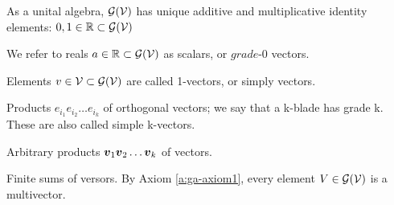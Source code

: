 \begin{definition}
    As a unital algebra, $\mathcal{G}(\mathcal{V})$ has unique additive and multiplicative identity elements: $0, 1 \in \mathbb{R} \subset \mathcal{G}(\mathcal{V})$
\end{definition}
\begin{definition}[Scalars]
    We refer to reals $a \in \mathbb{R} \subset \mathcal{G}(\mathcal{V})$ as scalars, or $\textit{grade-0}$ vectors.
\end{definition}
\begin{definition}[1-vectors]
    Elements $v \in \mathcal{V} \subset \mathcal{G}(\mathcal{V})$ are called 1-vectors, or simply vectors.
\end{definition}
\begin{definition}[k-blades] \label{d:k-blades}
	Products $e_{i_1}e_{i_2} \ldots e_{i_k}$ of orthogonal vectors; we say that a k-blade has grade k. These are also called simple k-vectors.
\end{definition}
\begin{definition}[Versors]
Arbitrary products $\boldsymbol{v}_1\boldsymbol{v}_2 \ldots \boldsymbol{v}_k$ of vectors.
\end{definition}
\begin{definition}[Multivectors]
	Finite sums of versors. By Axiom \ref{a:ga-axiom1}, every element $V \in \mathcal{G}(\mathcal{V})$ is a multivector.
\end{definition}
